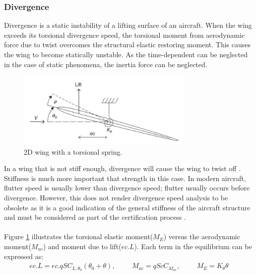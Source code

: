 \documentclass[11pt]{article}
\begin{document}
\subsubsection{Divergence}
Divergence is a static instability of a lifting surface of an aircraft. When the wing exceeds its torsional divergence speed, the torsional moment from aerodynamic force due to twist overcomes the structural elastic restoring moment. This causes the wing to become statically unstable\cite{RaymondL.Bisplinghoff2002PrinciplesAeroelasticity}. As the time-dependent can be neglected in the case of static phenomena, the inertia force can be neglected. \\
\begin{figure}
    \includegraphics[width=8.5cm]{figures/two-dimensional-wing-torsional-spring.png}
    \caption{2D wing with a torsional spring.}
    \label{fig:torsional-spring}
\end{figure} 
In a wing that is not stiff enough, divergence will cause the wing to twist off \cite{2011AeroelasticityFlutter}. Stiffness is much more important that strength in this case. In modern aircraft, flutter speed is usually lower than divergence speed; flutter usually occurs before divergence. However, this does not render divergence speed analysis to be obsolete as it is a good indication of the general stiffness of the aircraft structure and must be considered as part of the certification process \cite{Wright2015INTRODUCTIONLOADS}.\\ \\

\iffalse
Figure \ref{fig:torsional-spring} illustrates the torsional elastic moment($M_E$) versus the aerodynamic moment($M_{ac}$) and moment due to lift($ec.L$). Each term in the equilibrium can be expressed as:
\begin{eqnarray*}
ec.L = ec.qSC_{L,{\theta _0}}(\theta _0 + \theta),\hspace{1cm} M_{ac} = qScC_{M_{ac}},\hspace{1cm} M_E = K_{\theta}\theta
\end{eqnarray*}
\end{document}
